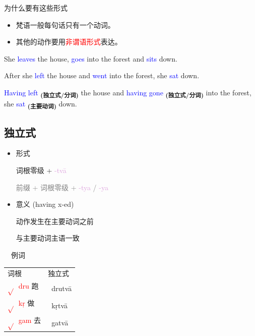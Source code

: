 \documentclass[17pt]{beamer}
\newcommand{\skt}[1]{{\sanskritfont{#1}}} %
\newcommand{\verbroot}[1]{\textcolor{red}{$\sqrt{}$#1}}
\newcommand{\sktroot}[1]{{\verbroot{\skt{#1}}}}
\newcommand{\skttransroot}[1]{{\sktroot{#1}~\textcolor{red}{#1}}}
\newcommand{\fullpada}[1]{\textcolor{OliveGreen}{#1}}
\newcommand{\sktpada}[1]{{\textcolor{OliveGreen}{\skt{#1}}}}
\newcommand{\skttranspada}[1]{{\sktpada{#1}~\fullpada{#1}}}
\newcommand{\pratyaya}[1]{\textcolor{Plum}{#1}}
\newcommand{\veryimportant}[1]{\textcolor{red}{#1}}
\newcommand{\important}[1]{\textcolor{blue}{#1}}
\newcommand{\notsoimportant}[1]{\textcolor{gray}{#1}}
\begin{document}
\begin{frame}{为什么要有这些形式}
  \begin{itemize}
    \item 梵语一般每句话只有一个动词。
    \item 其他的动作要用\veryimportant{非谓语形式}表达。
  \end{itemize}
  \bigskip
  \centering
    {
    \footnotesize
    She \important{leaves} the house, \important{goes} into the forest and \important{sits} down.

    After she \important{left} the house and \important{went} into the forest, she \important{sat} down.

    \important{Having left} \textsubscript{\textbf{(独立式/分词)}}  the house and \important{having gone} \textsubscript{\textbf{(独立式/分词)}}  into the forest, 
she \important{sat} \textsubscript{\textbf{(主要动词)}} down.
    }
\end{frame}

\subsection{独立式}
\begin{frame}{\insertsubsection}
  \begin{itemize}
    \item 形式
    
    词根零级 + \pratyaya{\nobreakdash-tvā} 

    \notsoimportant{前缀 + 词根零级 + \pratyaya{\nobreakdash-tya} / \pratyaya{\nobreakdash-ya}}
    \item 意义 (having x\nobreakdash-ed)
    
    动作发生在主要动词之前 

    与主要动词主语一致
  \end{itemize}
\end{frame}

\begin{frame}{\insertsubsection  ~~例词}
  \centering
  \begin{tabular}{@{}ll@{}} %
    词根 & 独立式  \\
    \skttransroot{dru} 跑 & \skttranspada{drutvā}  \\
    \skttransroot{kṛ} 做 & \skttranspada{kṛtvā}  \\
    \skttransroot{gam} 去 & \skttranspada{gatvā}  \\
  \end{tabular}
\end{frame}
\end{document}
